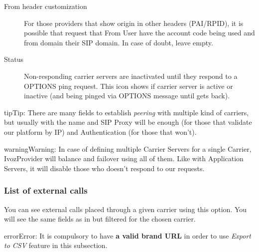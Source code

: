 \documentclass[letterpaper,10pt,english]{sphinxmanual}
\begin{document}
\begin{description}
\item[{From header customization}] \leavevmode{}\label{administration_portal/brand/providers/carriers:term-from-header-customization}
For those providers that show origin in other headers (PAI/RPID), it is
possible that request that From User have the account code being used
and from domain their SIP domain. In case of doubt, leave empty.

\item[{Status}] \leavevmode{}\label{administration_portal/brand/providers/carriers:term-16}
Non-responding carrier servers are inactivated until they respond to a OPTIONS ping request. This icon shows
if carrier server is active or inactive (and being pinged via OPTIONS message until gets back).

\end{description}

\begin{notice}{tip}{Tip:}
There are many fields to establish \emph{peering} with multiple kind of
carriers, but usually with the name and SIP Proxy will be enough (for
those that validate our platform by IP) and Authentication (for those that
won't).
\end{notice}

\begin{notice}{warning}{Warning:}
In case of defining multiple Carrier Servers for a single
Carrier, IvozProvider will balance and failover using all of them.
Like with Application Servers, it will disable those who doesn't respond to
our requests.
\end{notice}


\subsubsection{List of external calls}
\label{administration_portal/brand/providers/carriers:list-of-external-calls}
You can see external calls placed through a given carrier using this option. You will see the same fields as in
{\hyperref[administration_portal/platform/external_calls:external\string-calls]{}} but filtered for the chosen carrier.

\begin{notice}{error}{Error:}
It is compulsory to have \textbf{a valid brand URL} in order to use \emph{Export to CSV} feature in this subsection.
\end{notice}
\end{document}
